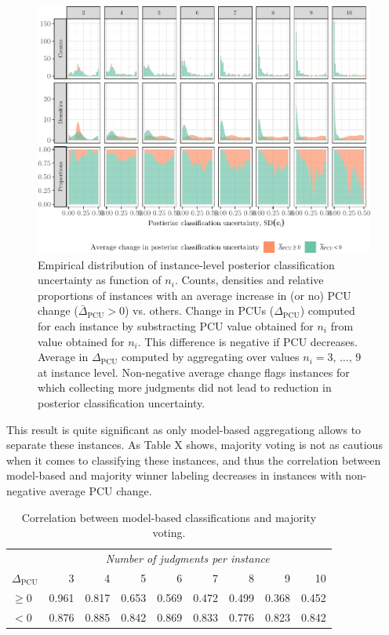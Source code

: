 \documentclass[12pt,]{article}
\begin{document}
\begin{figure}[H]

{\centering \includegraphics{licht_2019_evaluating_crowdsourced_elite_critique_codings_files/figure-latex/avg_pcu_change_test-1} 

}

\caption{Empirical distribution of instance-level posterior classification uncertainty as function of $n_i$. Counts, densities and relative proportions of instances with an average increase in (or no) PCU change ($\bar{\Delta}_{\text{PCU}} > 0$) vs. others. Change in PCUs ($\Delta_{\text{PCU}}$) computed for each instance by substracting PCU value obtained for $n_i$ from value obtained for $n_i$. This difference is negative if PCU decreases. Average in $\Delta_{\text{PCU}}$ computed by aggregating over values $n_i = 3,\,\ldots ,\,9$ at instance level. Non-negative average change flags instances for which collecting more judgments did not lead to reduction in posterior classification uncertainty.}\label{fig:avg_pcu_change_test}
\end{figure}

This result is quite significant as only model-based aggregationg allows
to separate these instances. As Table X shows, majority voting is not as
cautious when it comes to classifying these instances, and thus the
correlation between model-based and majority winner labeling decreases
in instances with non-negative average PCU change.

\begin{table}[!h]

\caption{\label{tab:tab corr mv test}Correlation between model-based classifications and majority voting.}
\centering
\begin{tabular}{lrrrrrrrr}
\toprule
\multicolumn{1}{c}{\em  } & \multicolumn{8}{c}{\em Number of judgments per instance} \\
\cmidrule(l{2pt}r{2pt}){2-9}
$\Delta_{\text{PCU}}$ & 3 & 4 & 5 & 6 & 7 & 8 & 9 & 10\\
\midrule
$\geq 0$ & 0.961 & 0.817 & 0.653 & 0.569 & 0.472 & 0.499 & 0.368 & 0.452\\
$< 0$ & 0.876 & 0.885 & 0.842 & 0.869 & 0.833 & 0.776 & 0.823 & 0.842\\
\bottomrule
\end{tabular}
\end{table}
\end{document}
